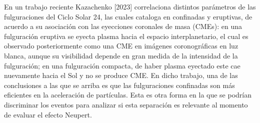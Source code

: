 \documentclass[baaa]{baaa}
\begin{document}
En un trabajo reciente Kazachenko [2023]\nocite{Kazachenko:2023} correlaciona distintos par\'ametros de las 
fulguraciones del Ciclo Solar 24, las cuales cataloga en confinadas y eruptivas, de acuerdo a su asociaci\'on 
con las eyecciones coronales de masa (CMEs): en una fulguraci\'on eruptiva se eyecta plasma hacia el espacio 
interplanetario, el cual es observado posteriormente como una CME en im\'agenes coronogr\'aficas en luz blanca, aunque 
su visibilidad depende en gran medida de la intensidad de la fulguraci\'on; en una fulguraci\'on compacta, de haber plasma 
eyectado este cae nuevamente hacia el Sol y no se produce CME. En dicho trabajo, una de las conclusiones a las que se arriba 
es que las fulguraciones confinadas son más eficientes en la aceleraci\'on de part\'iculas. Esta es otra forma en la que se 
podr\'ian discriminar los eventos para analizar si esta separaci\'on es relevante al momento de evaluar el efecto Neupert. 






\small

 
\end{document}
